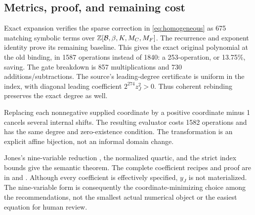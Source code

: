 \subsection{Metrics, proof, and remaining cost}

Exact expansion verifies the sparse correction in
\eqref{eq:homogeneous} as 675 matching symbolic terms over
$\mathbb Z[\mathcal B,\beta,K,M_C,M_F]$. The recurrence and exponent identity
prove its remaining baseline. This gives the exact original polynomial at
the old binding, in 1587 operations instead of 1840: a 253-operation, or
13.75\%, saving. The gate breakdown is 857 multiplications and 730
additions/subtractions. The source's leading-degree certificate is uniform
in the index, with diagonal leading coefficient $2^{274}z_J^2>0$.
Thus coherent rebinding preserves the exact degree as well.

Replacing each nonnegative supplied coordinate by a positive coordinate
minus 1 cancels several internal shifts. The resulting evaluator costs
1582 operations and has the same degree and zero-existence condition. The
transformation is an explicit affine bijection, not an informal domain
change.

Jones's nine-variable reduction \cite{jones,repojones}, the normalized
quartic, and the strict index bounds give the semantic theorem. The complete
coefficient recipes and proof are in  and
. Although every coefficient is effectively
specified, $y_J$ is not materialized. The nine-variable form is consequently
the coordinate-minimizing choice among the recommendations, not the
smallest actual numerical object or the easiest equation for human review.
